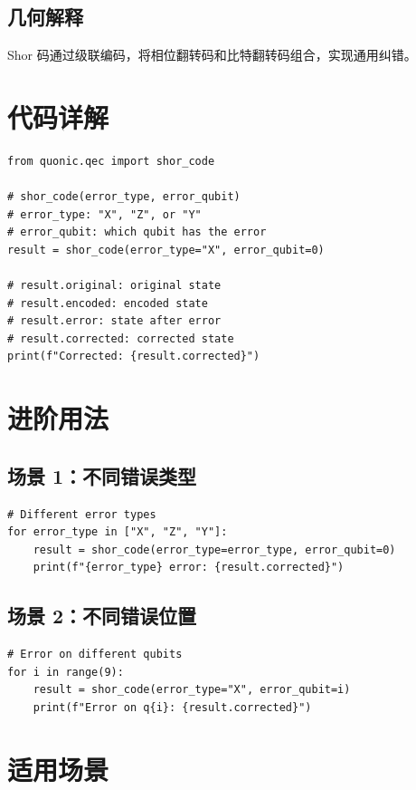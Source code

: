 \documentclass[12pt,a4paper]{article}
\begin{document}
\subsection{几何解释}

Shor 码通过级联编码，将相位翻转码和比特翻转码组合，实现通用纠错。

\section{代码详解}

\begin{lstlisting}[style=python]
from quonic.qec import shor_code

# shor_code(error_type, error_qubit)
# error_type: "X", "Z", or "Y"
# error_qubit: which qubit has the error
result = shor_code(error_type="X", error_qubit=0)

# result.original: original state
# result.encoded: encoded state
# result.error: state after error
# result.corrected: corrected state
print(f"Corrected: {result.corrected}")
\end{lstlisting}

\section{进阶用法}

\subsection{场景 1：不同错误类型}

\begin{lstlisting}[style=python]
# Different error types
for error_type in ["X", "Z", "Y"]:
    result = shor_code(error_type=error_type, error_qubit=0)
    print(f"{error_type} error: {result.corrected}")
\end{lstlisting}

\subsection{场景 2：不同错误位置}

\begin{lstlisting}[style=python]
# Error on different qubits
for i in range(9):
    result = shor_code(error_type="X", error_qubit=i)
    print(f"Error on q{i}: {result.corrected}")
\end{lstlisting}

\section{适用场景}
\end{document}
